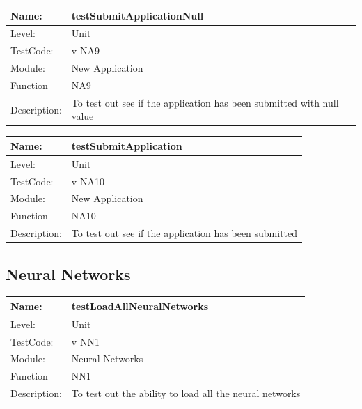 \documentclass[12pt]{article}
\begin{document}
\begin{center}
\begin{tabular}{|l|p{12cm}|}
\hline

 Name: & testSubmitApplicationNull  \\
\hline
Level: & Unit \\
\hline
TestCode: & v NA9 \\
\hline
Module:& New Application\\
\hline
Function & NA9 \\
\hline
Description: & To test out see if the application has been submitted with null value  \\
\hline

\end{tabular}
\end{center}


\begin{center}
\begin{tabular}{|l|p{12cm}|}
\hline

 Name: & testSubmitApplication \\
\hline
Level: & Unit \\
\hline
TestCode: & v NA10 \\
\hline
Module:& New Application\\
\hline
Function & NA10 \\
\hline
Description: & To test out see if the application has been submitted   \\
\hline

\end{tabular}
\end{center}

\subsection{Neural Networks}

\begin{center}
\begin{tabular}{|l|p{12cm}|}
\hline

 Name: & testLoadAllNeuralNetworks \\
 \hline
Level: & Unit \\
\hline
TestCode: & v NN1 \\
\hline
Module:& Neural Networks \\
\hline
Function & NN1 \\
\hline
Description: & To test out the ability to load all the neural networks  \\
\hline
\end{tabular}
\end{center}
\end{document}
